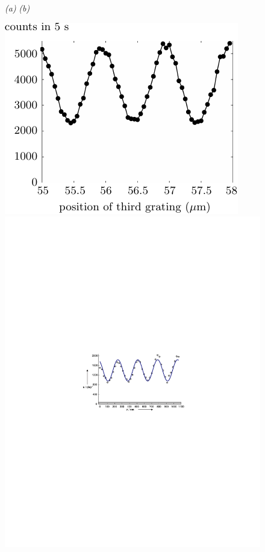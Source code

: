 \documentclass[3p,sort&compress]{elsarticle}
\begin{document}
\begin{figure}
{\footnotesize \hspace{.4cm} \emph{(a)} \hspace{6.7cm} \emph{(b)} }

\vspace{.2cm}

\centering
\includegraphics[scale=0.9]{c70pat.pdf} \hspace{.8cm} \includegraphics[scale=.9]{tp.pdf}

\end{figure}
\end{document}
